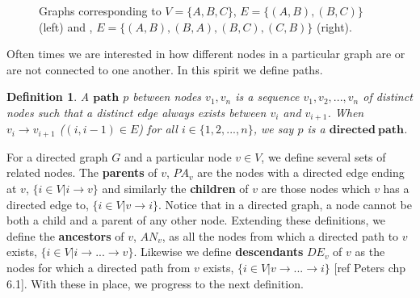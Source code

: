 \documentclass[12pt]{article}
\newtheorem{definition}{Definition}[section]
\theoremstyle{definition}
\begin{document}
\begin{figure}
\centering
{}
\caption{Graphs corresponding to $V = \{A,B,C\}$, $E = \{(A,B), (B,C)\}$ (left) and , $E = \{(A,B), (B,A), (B,C), (C,B)\}$ (right). } \label{fig:M1}
\end{figure}

 Often times we are interested in how different nodes in a particular graph are or are not connected to one another. In this spirit we define paths.
 
\begin{definition}
A $\mathbf{path}$ $p$ between nodes $v_1, v_n$ is a sequence $v_1, v_2, ..., v_n$  of distinct nodes such that a distinct edge always exists between $v_i$ and $v_{i+1}$. When $v_i \rightarrow v_{i+1}$ ($(i, i-1) \in E$) for all $i \in \{1,2,...,n \}$, we say $p$ is a $\mathbf{directed \ path}$.
\end{definition}




For a directed graph $G$ and a particular node $v \in V$, we define several sets of related nodes. The \textbf{parents} of $v$, $PA_v$ are the nodes with a directed edge ending at $v$, $\{i \in V | i \rightarrow v \}$ and similarly the \textbf{children} of $v$ are those nodes which $v$ has a directed edge to, $\{i \in V | v \rightarrow i \}$. Notice that in a directed graph, a node cannot be both a child and a parent of any other node. Extending these definitions, we define the \textbf{ancestors} of $v$, $AN_v$, as all the nodes from which a directed path to $v$ exists,  $\{i \in V | i \rightarrow ... \rightarrow v \}$. Likewise we define \textbf{descendants} $DE_v$ of $v$ as the nodes for which a directed path from $v$ exists,   $\{i \in V | v \rightarrow ... \rightarrow i \}$ [ref Peters chp 6.1]. With these in place, we progress to the next definition.
\end{document}
